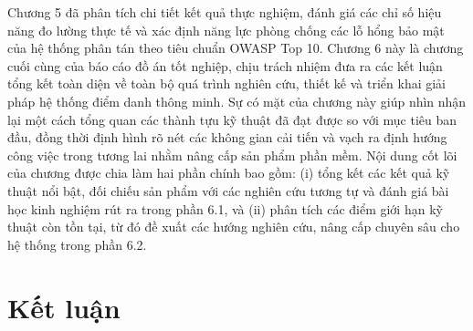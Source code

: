 \documentclass[../DoAn.tex]{subfiles}
\begin{document}
Chương 5 đã phân tích chi tiết kết quả thực nghiệm, đánh giá các chỉ số hiệu năng đo lường thực tế và xác định năng lực phòng chống các lỗ hổng bảo mật của hệ thống phân tán theo tiêu chuẩn OWASP Top 10. Chương 6 này là chương cuối cùng của báo cáo đồ án tốt nghiệp, chịu trách nhiệm đưa ra các kết luận tổng kết toàn diện về toàn bộ quá trình nghiên cứu, thiết kế và triển khai giải pháp hệ thống điểm danh thông minh. Sự có mặt của chương này giúp nhìn nhận lại một cách tổng quan các thành tựu kỹ thuật đã đạt được so với mục tiêu ban đầu, đồng thời định hình rõ nét các không gian cải tiến và vạch ra định hướng công việc trong tương lai nhằm nâng cấp sản phẩm phần mềm. Nội dung cốt lõi của chương được chia làm hai phần chính bao gồm: (i) tổng kết các kết quả kỹ thuật nổi bật, đối chiếu sản phẩm với các nghiên cứu tương tự và đánh giá bài học kinh nghiệm rút ra trong phần 6.1, và (ii) phân tích các điểm giới hạn kỹ thuật còn tồn tại, từ đó đề xuất các hướng nghiên cứu, nâng cấp chuyên sâu cho hệ thống trong phần 6.2.

\section{Kết luận}
\label{section:6.1}
\end{document}
